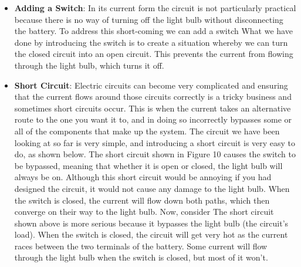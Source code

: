 \documentclass{report}
\begin{document}
\begin{itemize}
\begin{itemize}
                \item \textbf{Load} - In order to do something useful, an electric circuit needs to have a load. In our case, the load is the light bulb. In electronic circuits, the load is made up of components such as resistors, capacitors, light emitting diodes (LEDs), buzzers, motors, and light sensors.
            \end{itemize}
        \item \textbf{Adding a Switch}: In its current form the circuit is not particularly practical because there is no way of turning off the light bulb without disconnecting the battery. To address this short-coming we can add a switch
            \bigbreak \noindent 
            \bigbreak \noindent 
            What we have done by introducing the switch is to create a situation whereby we can turn the closed circuit into an open circuit. This prevents the current from flowing through the light bulb, which turns it off.
        \item \textbf{Short Circuit}: Electric circuits can become very complicated and ensuring that the current flows around those circuits correctly is a tricky business and sometimes short circuits occur. This is when the current takes an alternative route to the one you want it to, and in doing so incorrectly bypasses some or all of the components that make up the system. The circuit we have been looking at so far is very simple, and introducing a short circuit is very easy to do, as shown below.
            \bigbreak \noindent 
            \bigbreak \noindent 
            The short circuit shown in Figure 10 causes the switch to be bypassed, meaning that whether it is open or closed, the light bulb will always be on. Although this short circuit would be annoying if you had designed the circuit, it would not cause any damage to the light bulb.
            \bigbreak \noindent 
            When the switch is closed, the current will flow down both paths, which then converge on their way to the light bulb.
            \bigbreak \noindent 
            Now, consider
            \bigbreak \noindent 
            \bigbreak \noindent 
            The short circuit shown above is more serious because it bypasses the light bulb (the circuit's load). When the switch is closed, the circuit will get very hot as the current races between the two terminals of the battery. Some current will flow through the light bulb when the switch is closed, but most of it won't.

\end{itemize}
\end{document}
